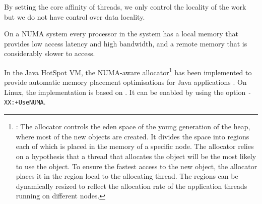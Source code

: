By setting the core affinity of threads, we only control the locality
of the work but we do not have control over data locality.

On a NUMA system every processor in the system has a local memory that
provides low access latency and high bandwidth, and a remote memory
that is considerably slower to access.

In the Java HotSpot VM, the NUMA-aware
allocator\footnote{\cite{Oracle2010}: The allocator controls the eden
  space of the young generation of the heap, where most of the new
  objects are created. It divides the space into regions each of which
  is placed in the memory of a specific node. The allocator relies on
  a hypothesis that a thread that allocates the object will be the
  most likely to use the object. To ensure the fastest access to the
  new object, the allocator places it in the region local to the
  allocating thread. The regions can be dynamically resized to reflect
  the allocation rate of the application threads running on different
  nodes.} has been implemented to provide automatic memory placement
optimisations for Java applications \cite{Masamitsu2008, Oracle2010,
  Humble2010}. On Linux, the implementation is based on
\cite{Kleen2004}. It can be enabled by using the option
\verb!-XX:+UseNUMA!.


